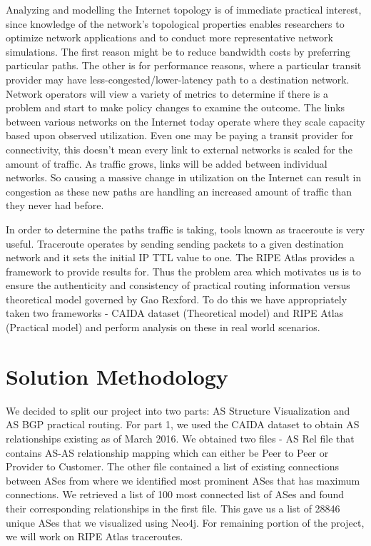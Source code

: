 \documentclass{sig-alternate-05-2015}
\begin{document}
Analyzing and modelling the Internet topology is of immediate practical interest, since knowledge of the network's topological properties enables researchers to optimize network applications and to conduct more representative network simulations. The first reason might be to reduce bandwidth costs by preferring particular paths. The other is for performance reasons, where a particular transit provider may have less-congested/lower-latency path to a destination network. Network operators will view a variety of metrics to determine if there is a problem and start to make policy changes to examine the outcome. The links between various networks on the Internet today operate where they scale capacity based upon observed utilization. Even one may be paying a transit provider for connectivity, this doesn't mean every link to external networks is scaled for the amount of traffic. As traffic grows, links will be added between individual networks. So causing a massive change in utilization on the Internet can result in congestion as these new paths are handling an increased amount of traffic than they never had before. 

In order to determine the paths traffic is taking, tools known as traceroute is very useful. Traceroute operates by sending sending packets to a given destination network and it sets the initial IP TTL value to one. The RIPE Atlas provides a framework to provide results for. Thus the problem area which motivates us is to ensure the authenticity and consistency of practical routing information versus theoretical model governed by Gao Rexford. To do this we have appropriately taken two frameworks - CAIDA dataset (Theoretical model) and RIPE Atlas (Practical model) and perform analysis on these in real world scenarios.

\section{Solution Methodology}

We decided to split our project into two parts: AS Structure Visualization and AS BGP practical routing. For part 1, we used the CAIDA dataset to obtain AS relationships existing as of March 2016. We obtained two files - AS Rel file that contains AS-AS relationship mapping which can either be Peer to Peer or Provider to Customer. The other file contained a list of existing connections between ASes from where we identified most prominent ASes that has maximum connections. We retrieved a list of 100 most connected list of ASes and found their corresponding relationships in the first file. This gave us a list of 28846 unique ASes that we visualized using Neo4j.
For remaining portion of the project, we will work on RIPE Atlas traceroutes.
\end{document}
